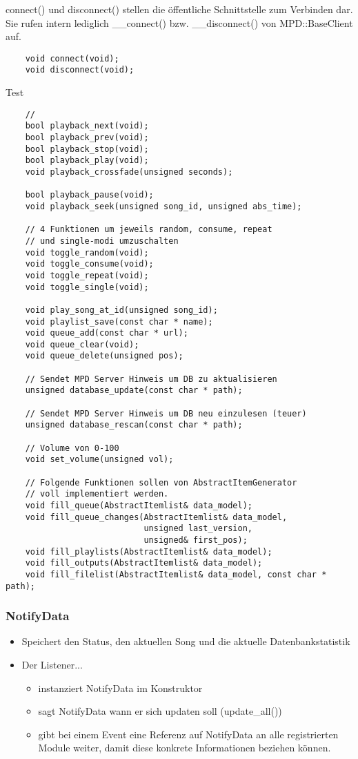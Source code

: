 connect() und disconnect() stellen die öffentliche Schnittstelle zum Verbinden dar.
Sie rufen intern lediglich \_\_connect() bzw. \_\_disconnect() von MPD::BaseClient auf.
\begin{verbatim}
    void connect(void);
    void disconnect(void);
\end{verbatim}

Test

\begin{verbatim}
    // 
    bool playback_next(void);
    bool playback_prev(void);
    bool playback_stop(void);
    bool playback_play(void);
    void playback_crossfade(unsigned seconds);
    
    bool playback_pause(void);
    void playback_seek(unsigned song_id, unsigned abs_time);
    
    // 4 Funktionen um jeweils random, consume, repeat 
    // und single-modi umzuschalten
    void toggle_random(void);
    void toggle_consume(void);
    void toggle_repeat(void);
    void toggle_single(void);

    void play_song_at_id(unsigned song_id);
    void playlist_save(const char * name);
    void queue_add(const char * url);
    void queue_clear(void);
    void queue_delete(unsigned pos);

    // Sendet MPD Server Hinweis um DB zu aktualisieren
    unsigned database_update(const char * path);

    // Sendet MPD Server Hinweis um DB neu einzulesen (teuer)
    unsigned database_rescan(const char * path);

    // Volume von 0-100
    void set_volume(unsigned vol);
    
    // Folgende Funktionen sollen von AbstractItemGenerator
    // voll implementiert werden.
    void fill_queue(AbstractItemlist& data_model);
    void fill_queue_changes(AbstractItemlist& data_model,
                            unsigned last_version,
                            unsigned& first_pos);
    void fill_playlists(AbstractItemlist& data_model);
    void fill_outputs(AbstractItemlist& data_model);
    void fill_filelist(AbstractItemlist& data_model, const char * path);
\end{verbatim}

\subsubsection{NotifyData}
\begin{itemize}
    \item Speichert den Status, den aktuellen Song und die aktuelle Datenbankstatistik
    \item Der Listener...
        \begin{itemize}
            \item instanziert NotifyData im Konstruktor
            \item sagt NotifyData wann er sich updaten soll (update\_all())
            \item gibt bei einem Event eine Referenz auf NotifyData an alle registrierten Module weiter,
                damit diese konkrete Informationen beziehen können.
        \end{itemize}
\end{itemize}

